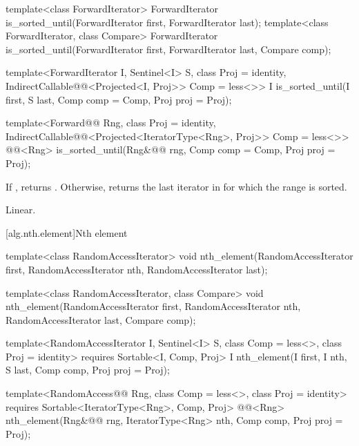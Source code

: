 %
\begin{removedblock}
\begin{itemdecl}
template<class ForwardIterator>
  ForwardIterator is_sorted_until(ForwardIterator first, ForwardIterator last);
template<class ForwardIterator, class Compare>
  ForwardIterator is_sorted_until(ForwardIterator first, ForwardIterator last,
    Compare comp);
\end{itemdecl}
\end{removedblock}
\begin{addedblock}
\begin{itemdecl}
template<ForwardIterator I, Sentinel<I> S, class Proj = identity,
    IndirectCallable@@<Projected<I, Proj>> Comp = less<>>
  I is_sorted_until(I first, S last, Comp comp = Comp{}, Proj proj = Proj{});

template<Forward@@ Rng, class Proj = identity,
    IndirectCallable@@<Projected<IteratorType<Rng>, Proj>> Comp = less<>>
  @@<Rng>
    is_sorted_until(Rng&@\newtxt{\&}@ rng, Comp comp = Comp{}, Proj proj = Proj{});
\end{itemdecl}
\end{addedblock}

\begin{itemdescr}
\pnum
\returns If , returns
. Otherwise, returns
the last iterator  in  for which the
range  is sorted.

\pnum
\complexity Linear.
\end{itemdescr}

[alg.nth.element]{Nth element}

%
\begin{removedblock}
\begin{itemdecl}
template<class RandomAccessIterator>
  void nth_element(RandomAccessIterator first, RandomAccessIterator nth,
                   RandomAccessIterator last);

template<class RandomAccessIterator, class Compare>
  void nth_element(RandomAccessIterator first, RandomAccessIterator nth,
                   RandomAccessIterator last,  Compare comp);
\end{itemdecl}
\end{removedblock}
\begin{addedblock}
\begin{itemdecl}
template<RandomAccessIterator I, Sentinel<I> S, class Comp = less<>,
    class Proj = identity>
  requires Sortable<I, Comp, Proj>
  I nth_element(I first, I nth, S last, Comp comp, Proj proj = Proj{});

template<RandomAccess@@ Rng, class Comp = less<>, class Proj = identity>
  requires Sortable<IteratorType<Rng>, Comp, Proj>
  @@<Rng>
    nth_element(Rng&@\newtxt{\&}@ rng, IteratorType<Rng> nth, Comp comp, Proj proj = Proj{});
\end{itemdecl}
\end{addedblock}

